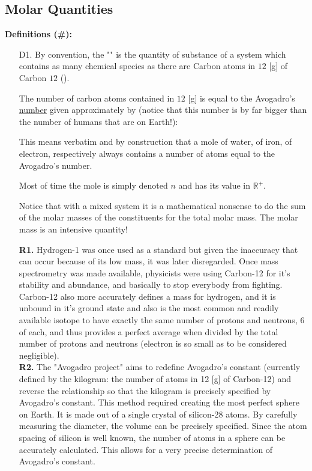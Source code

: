 	\subsection{Molar Quantities}
	\textbf{Definitions (\#\mydef):}
	\begin{enumerate}
		\item[D1.] By convention, the "" is the quantity of substance of a system which contains as many chemical species as there are Carbon atoms in $12$ [g] of Carbon $12$ ().
		
		The number of carbon atoms contained in $12$ [g] is equal to the Avogadro's \underline{number} given approximately by (notice that this number is by far bigger than the number of humans that are on Earth!):
		
		This means verbatim and by construction that a mole of water, of iron, of electron, respectively always contains a number of atoms equal to the Avogadro's number.
		
		Most of time the mole is simply denoted $n$ and has its value in $\mathbb{R}^{+}$.
		
		Notice that with a mixed system it is a mathematical nonsense to do the sum of the molar masses of the constituents for the total molar mass. The molar mass is an intensive quantity!
		\begin{tcolorbox}[title=Remarks,colframe=black,arc=10pt]
		\textbf{R1.} Hydrogen-1 was once used as a standard but given the inaccuracy that can occur because of its low mass, it was later disregarded. Once mass spectrometry was made available, physicists were using Carbon-12 for it's stability and abundance, and basically to stop everybody from fighting. Carbon-12 also more accurately defines a mass for hydrogen, and it is unbound in it's ground state and also is the most common and readily available isotope to have exactly the same number of protons and neutrons, $6$ of each, and thus provides a perfect average when divided by the total number of protons and neutrons (electron is so small as to be considered negligible). \\
		
		\textbf{R2.} The "Avogadro project" aims to redefine Avogadro's constant (currently defined by the kilogram: the number of atoms in 12 [g] of Carbon-12) and reverse the relationship so that the kilogram is precisely specified by Avogadro's constant. This method required creating the most perfect sphere on Earth. It is made out of a single crystal of silicon-28 atoms. By carefully measuring the diameter, the volume can be precisely specified. Since the atom spacing of silicon is well known, the number of atoms in a sphere can be accurately calculated. This allows for a very precise determination of Avogadro's constant.
		\end{tcolorbox}	
		

\end{enumerate}
